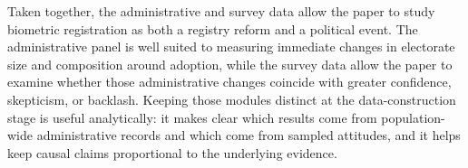 Taken together, the administrative and survey data allow the paper to study biometric registration as both a registry reform and a political event. The administrative panel is well suited to measuring immediate changes in electorate size and composition around adoption, while the survey data allow the paper to examine whether those administrative changes coincide with greater confidence, skepticism, or backlash. Keeping those modules distinct at the data-construction stage is useful analytically: it makes clear which results come from population-wide administrative records and which come from sampled attitudes, and it helps keep causal claims proportional to the underlying evidence.
